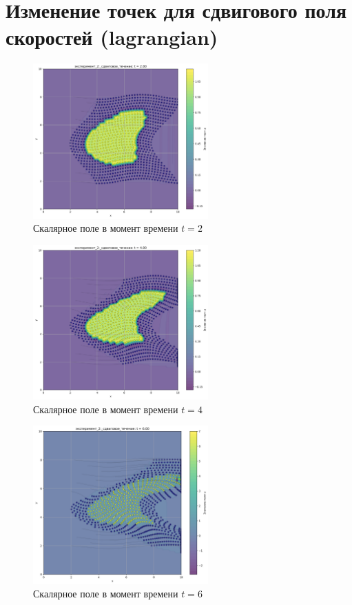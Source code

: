 \chapter{Изменение точек для сдвигового поля скоростей (lagrangian)}
\label{app:shear_lg}

\begin{figure}[h]
	\centering
	\includegraphics[width=0.6\textwidth]{imgs/lg/эксперимент_2:_сдвиговое_течение_t2.00.png}
	\caption{Скалярное поле в момент времени $t=2$ }
\end{figure}
\begin{figure}[h]
	\centering
	\includegraphics[width=0.6\textwidth]{imgs/lg/эксперимент_2:_сдвиговое_течение_t4.00.png}
	\caption{Скалярное поле в момент времени $t=4$}
\end{figure}
\begin{figure}[h]
	\centering
	\includegraphics[width=0.6\textwidth]{imgs/lg/эксперимент_2:_сдвиговое_течение_t6.00.png}
	\caption{Скалярное поле в момент времени $t=6$ }
\end{figure}
